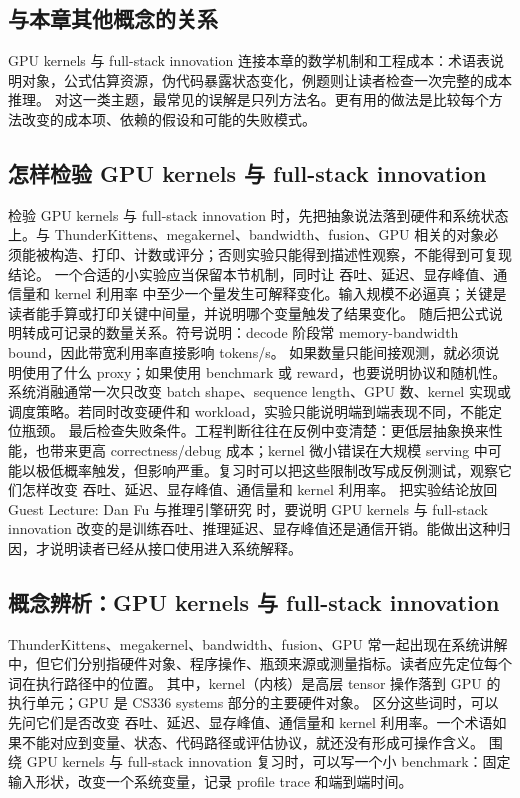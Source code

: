 \documentclass[a4paper]{article}
\begin{document}
\subsection{与本章其他概念的关系}
GPU kernels 与 full-stack innovation 连接本章的数学机制和工程成本：术语表说明对象，公式估算资源，伪代码暴露状态变化，例题则让读者检查一次完整的成本推理。
对这一类主题，最常见的误解是只列方法名。更有用的做法是比较每个方法改变的成本项、依赖的假设和可能的失败模式。
\subsection{怎样检验 GPU kernels 与 full-stack innovation}
检验 GPU kernels 与 full-stack innovation 时，先把抽象说法落到硬件和系统状态上。与 ThunderKittens、megakernel、bandwidth、fusion、GPU 相关的对象必须能被构造、打印、计数或评分；否则实验只能得到描述性观察，不能得到可复现结论。
一个合适的小实验应当保留本节机制，同时让 吞吐、延迟、显存峰值、通信量和 kernel 利用率 中至少一个量发生可解释变化。输入规模不必逼真；关键是读者能手算或打印关键中间量，并说明哪个变量触发了结果变化。
随后把公式说明转成可记录的数量关系。符号说明：decode 阶段常 memory-bandwidth bound，因此带宽利用率直接影响 tokens/s。 如果数量只能间接观测，就必须说明使用了什么 proxy；如果使用 benchmark 或 reward，也要说明协议和随机性。
系统消融通常一次只改变 batch shape、sequence length、GPU 数、kernel 实现或调度策略。若同时改变硬件和 workload，实验只能说明端到端表现不同，不能定位瓶颈。
最后检查失败条件。工程判断往往在反例中变清楚：更低层抽象换来性能，也带来更高 correctness/debug 成本；kernel 微小错误在大规模 serving 中可能以极低概率触发，但影响严重。复习时可以把这些限制改写成反例测试，观察它们怎样改变 吞吐、延迟、显存峰值、通信量和 kernel 利用率。
把实验结论放回 Guest Lecture: Dan Fu 与推理引擎研究 时，要说明 GPU kernels 与 full-stack innovation 改变的是训练吞吐、推理延迟、显存峰值还是通信开销。能做出这种归因，才说明读者已经从接口使用进入系统解释。
\subsection{概念辨析：GPU kernels 与 full-stack innovation}
ThunderKittens、megakernel、bandwidth、fusion、GPU 常一起出现在系统讲解中，但它们分别指硬件对象、程序操作、瓶颈来源或测量指标。读者应先定位每个词在执行路径中的位置。
其中，kernel（内核）是高层 tensor 操作落到 GPU 的执行单元；GPU 是 CS336 systems 部分的主要硬件对象。
区分这些词时，可以先问它们是否改变 吞吐、延迟、显存峰值、通信量和 kernel 利用率。一个术语如果不能对应到变量、状态、代码路径或评估协议，就还没有形成可操作含义。
围绕 GPU kernels 与 full-stack innovation 复习时，可以写一个小 benchmark：固定输入形状，改变一个系统变量，记录 profile trace 和端到端时间。
\end{document}
